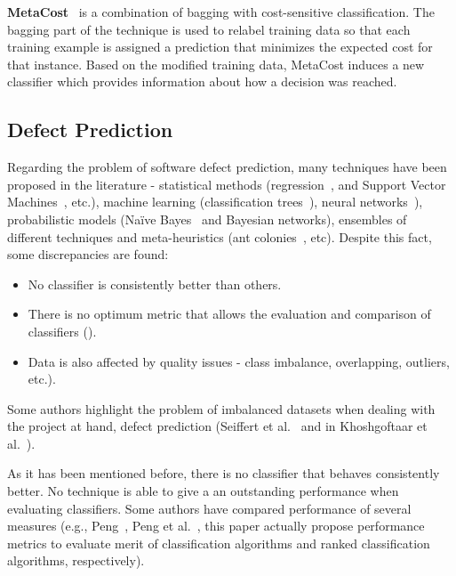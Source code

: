 
\textbf{MetaCost}~\cite{Domingos1999} is a combination of bagging with 
cost-sensitive classification. The bagging part of the technique is used to 
relabel training data so that each training example is assigned a prediction 
that minimizes the expected cost for that instance. Based on the modified 
training data, MetaCost induces a new classifier which provides information 
about how a decision was reached.

\subsection{Defect Prediction}\label{subsec:defectPrediction}

Regarding the problem of software defect prediction, many techniques have been 
proposed in the literature - statistical methods (regression~\cite{Bibi2008}, 
and Support Vector Machines~\cite{Elish2008}, etc.), machine learning 
(classification trees~\cite{Khoshgoftaar02}), neural 
networks~\cite{Khoshgoftaar97}), probabilistic models 
(Na\"ive Bayes~\cite{Menzies07b} and Bayesian networks), ensembles of different 
techniques and meta-heuristics (ant colonies~\cite{Vandecruys2008}, etc). 
Despite this fact, some discrepancies are found:

\begin{itemize}
    \item No classifier is consistently better than others.
    \item There is no optimum metric that allows the evaluation and comparison
    of classifiers (\cite{Mende09,Zhang07,Menzies07b}).
    \item Data is also affected by quality issues - class imbalance, 
    overlapping, outliers, etc.).
\end{itemize}

Some authors highlight the problem of imbalanced datasets when dealing with
the project at hand, defect prediction (Seiffert et al.~\cite{Seiffert2009} and 
in Khoshgoftaar et al.~\cite{Khoshgoftaar03}).

As it has been mentioned before, there is no classifier that behaves 
consistently better. No technique is able to give a an outstanding performance 
when evaluating classifiers. Some authors have compared performance of several 
measures (e.g., Peng~\cite{Peng2009}, Peng et al.~\cite{Peng2010}, this paper 
actually propose performance metrics to evaluate merit of classification 
algorithms and ranked classification algorithms, respectively).

